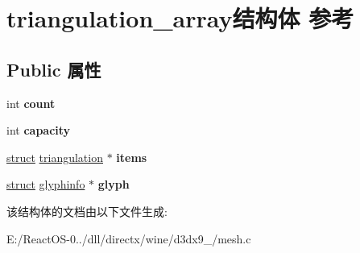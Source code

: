 \hypertarget{structtriangulation__array}{}\section{triangulation\+\_\+array结构体 参考}
\label{structtriangulation__array}
\subsection*{Public 属性}
\begin{DoxyCompactItemize}
\item 
\mbox{\label{structtriangulation__array_ad8a0f56d2032aca278a5de12c1d74eac}} 
int {\bfseries count}
\item 
\mbox{\label{structtriangulation__array_ad1f889b6c8767f62ab2c390336642de9}} 
int {\bfseries capacity}
\item 
\mbox{\label{structtriangulation__array_ab04eafaa0ce241e8a534e5d3252671b6}} 
\hyperlink{interfacestruct}{struct} \hyperlink{structtriangulation}{triangulation} $\ast$ {\bfseries items}
\item 
\mbox{\label{structtriangulation__array_af115b1c81b2d3ebdac331d4909b2c9e9}} 
\hyperlink{interfacestruct}{struct} \hyperlink{structglyphinfo}{glyphinfo} $\ast$ {\bfseries glyph}
\end{DoxyCompactItemize}


该结构体的文档由以下文件生成\+:\begin{DoxyCompactItemize}
\item 
E\+:/\+React\+O\+S-\/0../dll/directx/wine/d3dx9\+\_/mesh.\+c\end{DoxyCompactItemize}
